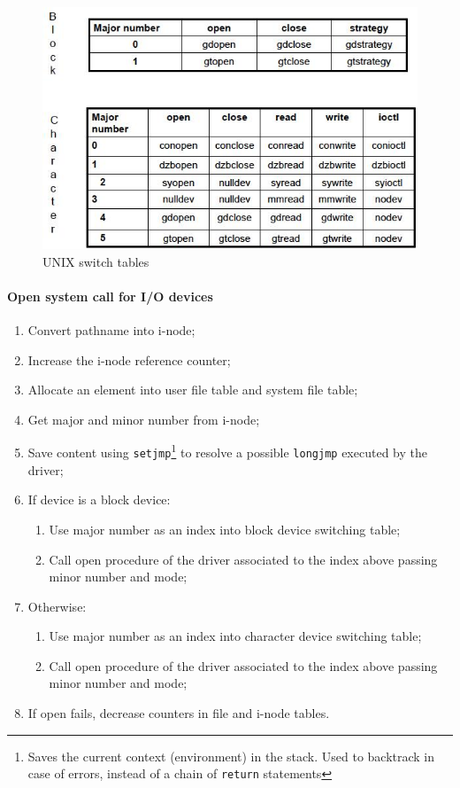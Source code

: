 \begin{figure}[hbtp]
\centering
\includegraphics[scale=0.4]{images/device_management/unix_switch_tables.jpg}
\caption{UNIX switch tables}
\end{figure}

\paragraph{Open system call for I/O devices}
\begin{enumerate}
\item Convert pathname into i-node;
\item Increase the i-node reference counter;
\item Allocate an element into user file table and system file table;
\item Get major and minor number from i-node;
\item Save content using \texttt{setjmp}\footnote{Saves the current context (environment) in the stack. Used to backtrack in case of errors, instead of a chain of \texttt{return} statements} to resolve a possible \texttt{longjmp} executed by the driver;
\item If device is a block device:
\begin{enumerate}
\item Use major number as an index into block device switching table;
\item Call open procedure of the driver associated to the index above passing minor number and mode;
\end{enumerate}
\item Otherwise:
\begin{enumerate}
\item Use major number as an index into character device switching table;
\item Call open procedure of the driver associated to the index above passing minor number and mode;
\end{enumerate}
\item If open fails, decrease counters in file and i-node tables.
\end{enumerate}

